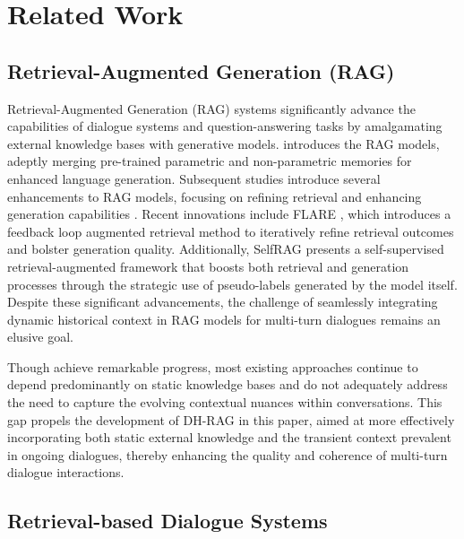 \section{Related Work}
\subsection{Retrieval-Augmented Generation (RAG)}
Retrieval-Augmented Generation (RAG) systems significantly advance the capabilities of dialogue systems and question-answering tasks by amalgamating external knowledge bases with generative models. \cite{lewis2020retrieval} introduces the RAG models, adeptly merging pre-trained parametric and non-parametric memories for enhanced language generation. Subsequent studies \cite{liu2020retrieval} introduce several enhancements to RAG models, focusing on refining retrieval \cite{wang2023knowledgpt, cheng2024lift} and enhancing generation capabilities \cite{anderson2022lingua, jiang2023longllmlingua}. Recent innovations include FLARE \cite{zhang2023flare}, which introduces a feedback loop augmented retrieval method to iteratively refine retrieval outcomes and bolster generation quality. Additionally, SelfRAG \cite{asai2023selfrag} presents a self-supervised retrieval-augmented framework that boosts both retrieval and generation processes through the strategic use of pseudo-labels generated by the model itself. Despite these significant advancements, the challenge of seamlessly integrating dynamic historical context in RAG models for multi-turn dialogues remains an elusive goal.

Though achieve remarkable progress, most existing approaches continue to depend predominantly on static knowledge bases and do not adequately address the need to capture the evolving contextual nuances within conversations. This gap propels the development of DH-RAG in this paper, aimed at more effectively incorporating both static external knowledge and the transient context prevalent in ongoing dialogues, thereby enhancing the quality and coherence of multi-turn dialogue interactions.

\subsection{Retrieval-based Dialogue Systems} 

